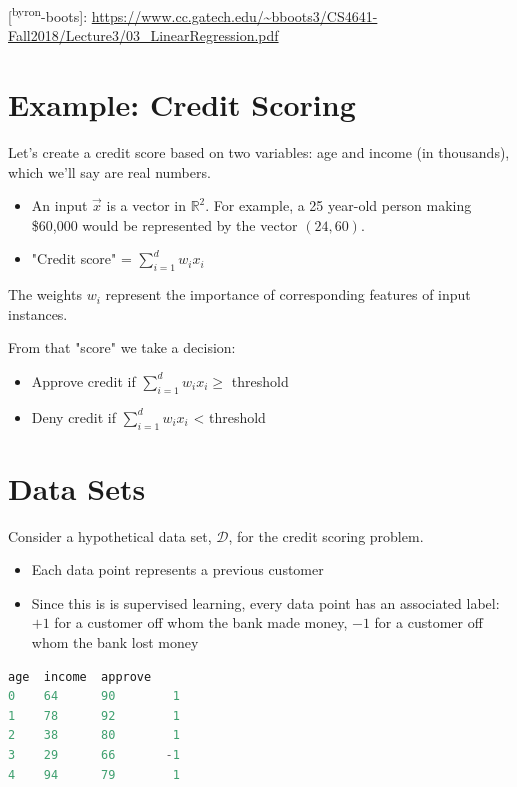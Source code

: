 \documentclass[11pt]{article}
\begin{document}
{[}\textsuperscript{byron}-boots]: \url{https://www.cc.gatech.edu/\~bboots3/CS4641-Fall2018/Lecture3/03\_LinearRegression.pdf}
\section{Example: Credit Scoring}
\label{sec:org3859f0d}

Let's create a credit score based on two variables: age and income (in thousands), which we'll say are real numbers.

\begin{itemize}
\item An input \(\vec{x}\) is a vector in \(\mathbb{R}^2\).  For example, a 25 year-old person making \$60,000 would be represented by the vector \((24, 60)\).

\item "Credit score" = \(\sum_{i=1}^{d} w_i x_i\)
\end{itemize}

The weights \(w_i\) represent the importance of corresponding features of input instances.

From that "score" we take a decision:

\begin{itemize}
\item Approve credit if \(\sum_{i=1}^{d} w_i x_i \ge\) threshold
\item Deny credit if \(\sum_{i=1}^{d} w_i x_i\) < threshold
\end{itemize}
\section{Data Sets}
\label{sec:org077b530}

Consider a hypothetical data set, \(\mathcal{D}\), for the credit scoring problem.

\begin{itemize}
\item Each data point represents a previous customer
\item Since this is is supervised learning, every data point has an associated label: \(+1\) for a customer off whom the bank made money, \(-1\) for a customer off whom the bank lost money
\end{itemize}

\begin{lstlisting}[language=Python,numbers=none]
    age  income  approve
0    64      90        1
1    78      92        1
2    38      80        1
3    29      66       -1
4    94      79        1
\end{lstlisting}
\end{document}
